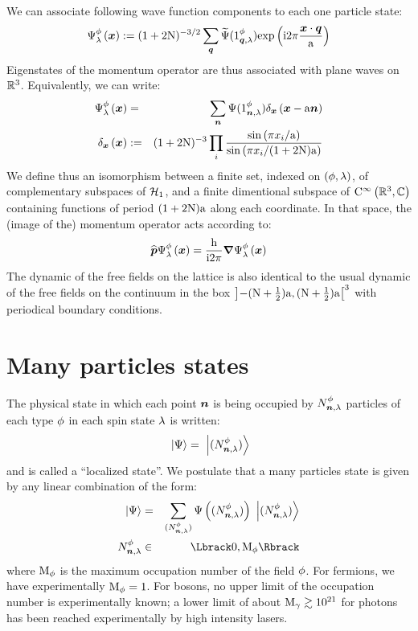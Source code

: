 \documentclass[10pt,a4paper,twoside,openany]{book}
\begin{document}
We can associate following wave function components to each one particle state:
\begin{equation*}
\wf \Psi \pt \sp {\sv x} \eqdef (1+2 \N)^{-3/2} \sum_{\q} \FT\Psi(\bQ 1 \pt \q \sp) \exp{\i 2 \pi \frac{\sv x \ssp \q}{\a}}
\end{equation*}
Eigenstates of the momentum operator are thus associated with plane waves on $\IR^3$. Equivalently, we can write:
\begin{eqnarray*}
\wf \Psi \pt \sp {\sv x} & = & \sum_{\n} \Psi(\bX 1 \pt \n \sp) \deltaX{\sv x - \a \n} \\
\deltaX{\sv x} & \eqdef & (1+2 \N)^{-3} \prod_i \frac{\sin{\pi \svc x i / \a}}{\sin{\pi \svc x i / (1+2 \N)\a}}
\end{eqnarray*}
We define thus an isomorphism between a finite set, indexed on $( \pt,\sp )$, of complementary subspaces of $\Hn 1$, and a finite dimentional subspace of $\mathrm C^\infty\left(\IR^3,\IC\right)$ containing functions of period $(1+2\N)\a$ along each coordinate. In that space, the (image of the) momentum operator acts according to:
\begin{equation*}
\Pop \wf \Psi \pt \sp {\sv x} = \frac{\h}{\i 2 \pi} \sv \nabla \wf \Psi \pt \sp {\sv x}
\end{equation*}
The dynamic of the free fields on the lattice is also identical to the usual dynamic of the free fields on the continuum in the box $\left]-(\N+\frac 1 2)\a,(\N+\frac 1 2)\a\right[^3$ with periodical boundary conditions.

\section{Many particles states}
\label{Many particles states}

The physical state in which each point $\n$ is being occupied by $\bX N \pt \n \sp$ particles of each type $\pt$ in each spin state $\sp$ is written:
\begin{equation*}
\ket{\Psi} = \ketFX N \pt \n \sp
\end{equation*}
and is called a ``localized state''. We postulate that a many particles state is given by any linear combination of the form:
\begin{eqnarray*}
\ket{\Psi} & = & \sum_{\bFX N \pt \n \sp} \Psi \left(\bFX N \pt \n \sp \right) \ketFX N \pt \n \sp \\
\bX N \pt \n \sp & \in & \IntRange{0}{\M \pt}
\end{eqnarray*}
where $\M \pt$ is the maximum occupation number of the field $\pt$. For fermions, we have experimentally $\M \pt = 1$. For bosons, no upper limit of the occupation number is experimentally known; a lower limit of about $\M \photon \gtrsim 10^{21}$ for photons has been reached experimentally by high intensity lasers.
\end{document}
